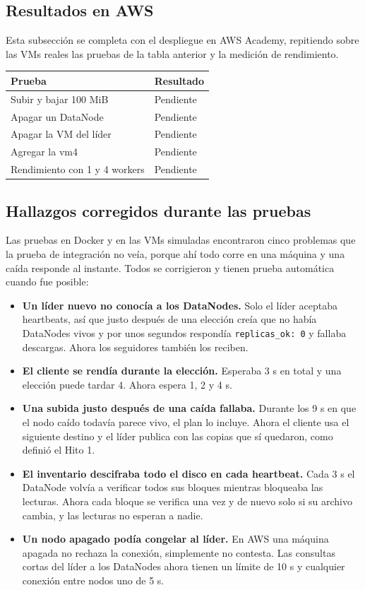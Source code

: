 \documentclass[10pt]{article}
\begin{document}
\subsection{Resultados en AWS}

Esta subsección se completa con el despliegue en AWS Academy, repitiendo sobre las VMs reales las pruebas de la tabla anterior y la medición de rendimiento.

\begin{xltabular}{\linewidth}{@{}L{5.6cm}Y@{}}
\toprule
Prueba & Resultado \\
\midrule\endhead
Subir y bajar 100 MiB & Pendiente \\
Apagar un DataNode & Pendiente \\
Apagar la VM del líder & Pendiente \\
Agregar la vm4 & Pendiente \\
Rendimiento con 1 y 4 workers & Pendiente \\
\bottomrule
\end{xltabular}

\subsection{Hallazgos corregidos durante las pruebas}

Las pruebas en Docker y en las VMs simuladas encontraron cinco problemas que la prueba de integración no veía, porque ahí todo corre en una máquina y una caída responde al instante. Todos se corrigieron y tienen prueba automática cuando fue posible:

\begin{itemize}
\item \textbf{Un líder nuevo no conocía a los DataNodes.} Solo el líder aceptaba heartbeats, así que justo después de una elección creía que no había DataNodes vivos y por unos segundos respondía \texttt{replicas\_ok: 0} y fallaba descargas. Ahora los seguidores también los reciben.
\item \textbf{El cliente se rendía durante la elección.} Esperaba 3 s en total y una elección puede tardar 4. Ahora espera 1, 2 y 4 s.
\item \textbf{Una subida justo después de una caída fallaba.} Durante los 9 s en que el nodo caído todavía parece vivo, el plan lo incluye. Ahora el cliente usa el siguiente destino y el líder publica con las copias que sí quedaron, como definió el Hito 1.
\item \textbf{El inventario descifraba todo el disco en cada heartbeat.} Cada 3 s el DataNode volvía a verificar todos sus bloques mientras bloqueaba las lecturas. Ahora cada bloque se verifica una vez y de nuevo solo si su archivo cambia, y las lecturas no esperan a nadie.
\item \textbf{Un nodo apagado podía congelar al líder.} En AWS una máquina apagada no rechaza la conexión, simplemente no contesta. Las consultas cortas del líder a los DataNodes ahora tienen un límite de 10 s y cualquier conexión entre nodos uno de 5 s.
\end{itemize}
\end{document}
